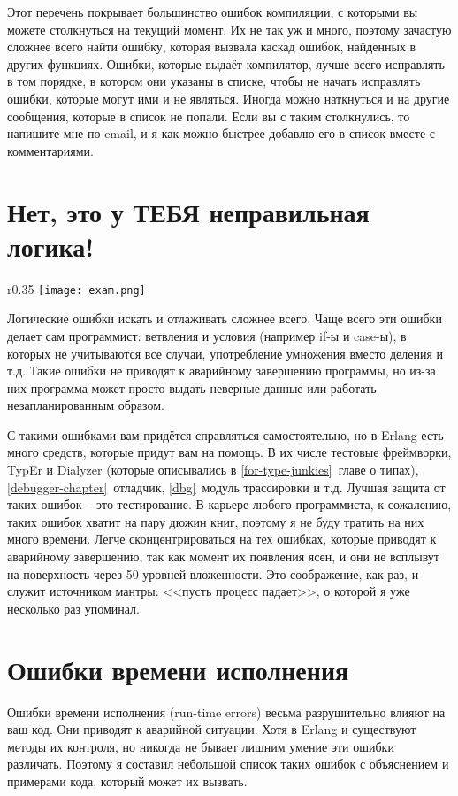 Этот перечень покрывает большинство ошибок компиляции, с которыми вы можете столкнуться на текущий момент. Их не так уж и много, поэтому зачастую сложнее всего найти ошибку, которая вызвала каскад ошибок, найденных в других функциях.
Ошибки, которые выдаёт компилятор, лучше всего исправлять в том порядке, в котором они указаны в списке, чтобы не начать исправлять ошибки, которые могут ими и не являться.
Иногда можно наткнуться и на другие сообщения, которые в список не попали.
Если вы с таким столкнулись, то напишите мне по email, и я как можно быстрее добавлю его в список вместе с комментариями.
\section{Нет, это у ТЕБЯ неправильная логика!}
\label{no-your-logic-is-wrong}
\begin{wrapfigure}{r}{0.35\linewidth}
    \texttt{[image: exam.png]}
\end{wrapfigure}
Логические ошибки искать и отлаживать сложнее всего. Чаще всего эти ошибки делает сам программист: ветвления и условия (например if\--ы и case\--ы), в которых не учитываются все случаи, употребление умножения вместо деления и т.д.
Такие ошибки не приводят к аварийному завершению программы, но из\--за них программа может просто выдать неверные данные или работать незапланированным образом.

С такими ошибками вам придётся справляться самостоятельно, но в Erlang есть много средств, которые придут вам на помощь.
В их числе тестовые фреймворки, TypEr и Dialyzer (которые описывались в \ref{for-type-junkies}~главе о типах), \ref{debugger-chapter}~отладчик, \ref{dbg}~модуль трассировки и т.д.
Лучшая защита от таких ошибок \--- это тестирование.
В карьере любого программиста, к сожалению, таких ошибок хватит на пару дюжин книг, поэтому я не буду тратить на них много времени.
Легче сконцентрироваться на тех ошибках, которые приводят к аварийному завершению, так как момент их появления ясен, и они не всплывут на поверхность через 50 уровней вложенности.
Это соображение, как раз, и служит источником мантры: <<пусть процесс падает>>, о которой я уже несколько раз упоминал.
\section{Ошибки времени исполнения}
\label{run-time-errors}
Ошибки времени исполнения (run\--time errors) весьма разрушительно влияют на ваш код. Они приводят к аварийной ситуации.
Хотя в Erlang и существуют методы их контроля, но никогда не бывает лишним умение эти ошибки различать.
Поэтому я составил небольшой список таких ошибок с объяснением и примерами кода, который может их вызвать.

